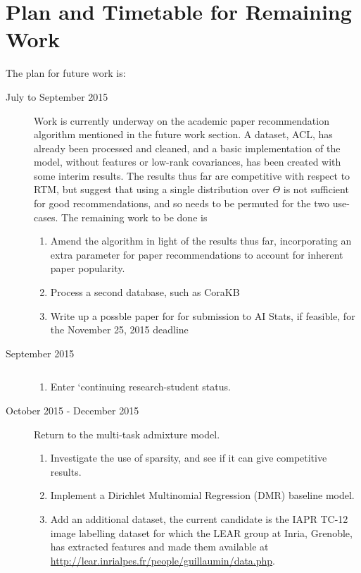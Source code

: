 

\section{Plan and Timetable for Remaining Work}

The plan for future work is:
\begin{description}
\item[July to September 2015] $\text{ } $\\
Work is currently underway on the academic paper recommendation algorithm mentioned in the future work section. A dataset, ACL, has already been processed and cleaned, and a basic implementation of the model, without features or low-rank covariances, has been created with some interim results. The results thus far are competitive with respect to RTM, but suggest that using a single distribution over $\Theta$ is not sufficient for good recommendations, and so needs to be permuted for the two use-cases. The remaining work to be done is
\begin{enumerate}
    \item Amend the algorithm in light of the results thus far, incorporating an extra parameter for paper recommendations to account for inherent paper popularity.
    \item Process a second database, such as CoraKB
    \item Write up a possble paper for for submission to AI Stats, if feasible, for the November 25, 2015 deadline
\end{enumerate}
\item[September 2015] $\text{ } $\\
\begin{enumerate}
    \item Enter `continuing research-student status.
\end{enumerate}
\item[October 2015 - December 2015] $\text{ } $\\
Return to the multi-task admixture model. 
\begin{enumerate}
    \item Investigate the use of sparsity, and see if it can give competitive results. 
    \item Implement a Dirichlet Multinomial Regression (DMR) baseline model. 
    \item Add an additional dataset, the current candidate is the IAPR TC-12 image labelling dataset for which the LEAR group at Inria, Grenoble, has extracted features and made them available at \url{http://lear.inrialpes.fr/people/guillaumin/data.php}.

\end{enumerate}
\end{description}
